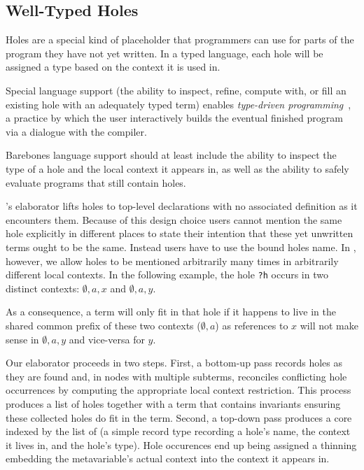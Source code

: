 \subsection{Well-Typed Holes}
\label{sec:design:holes}

Holes are a special kind of placeholder that programmers can use for parts of
the program they have not yet written.
%
In a typed language, each hole will be assigned a type based on the context it
is used in.

Special language support (the ability to inspect, refine, compute with,
or fill an existing hole with an adequately typed term)
enables \emph{type-driven programming}~\cite{DBLP:journals/pacmpl/OmarVCH19},
a practice by which the user interactively builds the eventual finished
program via a dialogue with the compiler.

Barebones language support should at least include the ability to inspect the
type of a hole and the local context it appears in, as well as the ability to
safely evaluate programs that still contain holes.



\Idris{}'s elaborator lifts holes to top-level declarations with no associated
definition as it encounters them.
%
Because of this design choice users cannot mention the same hole explicitly in
different places to state their intention that these yet unwritten terms ought
to be the same.
Instead users have to use the bound holes name.
%
In \Velo{}, however, we allow holes to be mentioned arbitrarily many times in
arbitrarily different local contexts. In the following example, the hole
\texttt{?h} occurs in two distinct contexts: $\emptyset,a,x$ and $\emptyset,a,y$.

\begin{center}
  \holeexamplegraph{}
\end{center}

As a consequence, a term will only fit in that hole if it happens to live in the
shared common prefix of these two contexts ($\emptyset,a$) as references to $x$
will not make sense in $\emptyset,a,y$ and vice-versa for $y$.


Our elaborator proceeds in two steps.
%
First, a bottom-up pass records holes as they are found and, in nodes
with multiple subterms, reconciles conflicting hole occurrences by
computing the appropriate local context restriction.
%
This process produces a list of holes together with a 
term that contains invariants ensuring these collected holes do fit in the term.
%
Second, a top-down pass produces a core  indexed by the list
of  (a simple record type recording a hole's name, the context
it lives in, and the hole's type). Hole occurences end up being assigned a thinning
embedding the metavariable's actual context into the context it appears in.


